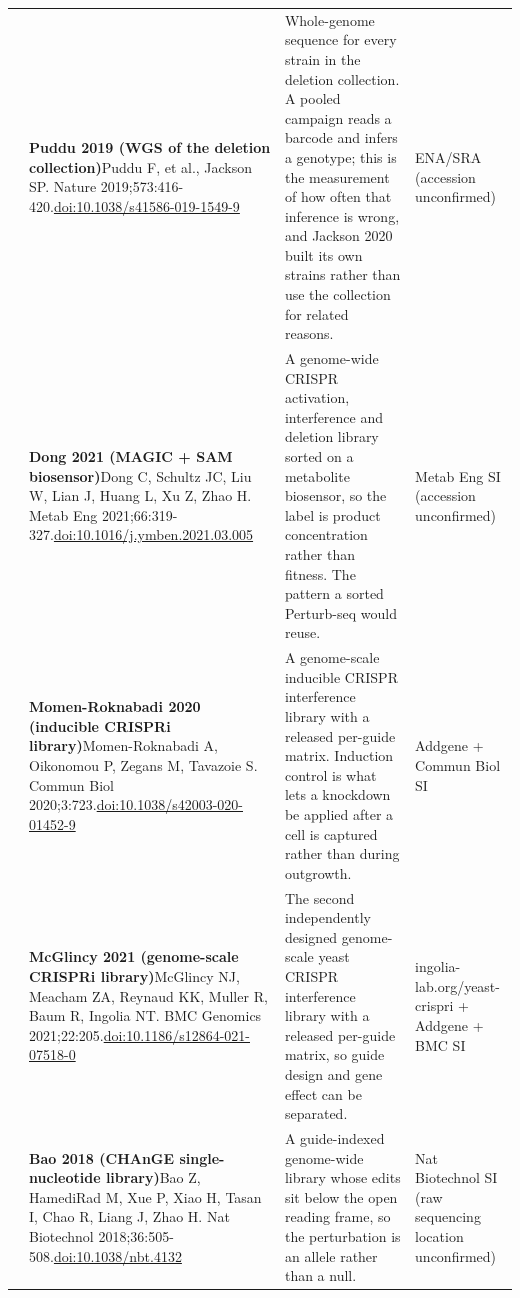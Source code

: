 \begin{landscape}
\begin{longtable}{@{}r@{\hspace{4pt}} L{86mm} L{92mm} L{62mm}@{}}
 & \textbf{Puddu 2019 (WGS of the deletion collection)}\newline Puddu F, et al., Jackson SP. Nature 2019;573:416-420.\newline \href{https://doi.org/10.1038/s41586-019-1549-9}{doi:10.1038/\allowbreak s41586-019-1549-9} & Whole-genome sequence for every strain in the deletion collection. A pooled campaign reads a barcode and infers a genotype; this is the measurement of how often that inference is wrong, and Jackson 2020 built its own strains rather than use the collection for related reasons. & ENA/\allowbreak SRA (accession unconfirmed) \\
 & \textbf{Dong 2021 (MAGIC + SAM biosensor)}\newline Dong C, Schultz JC, Liu W, Lian J, Huang L, Xu Z, Zhao H. Metab Eng 2021;66:319-327.\newline \href{https://doi.org/10.1016/j.ymben.2021.03.005}{doi:10.1016/\allowbreak j.ymben.2021.03.005} & A genome-wide CRISPR activation, interference and deletion library sorted on a metabolite biosensor, so the label is product concentration rather than fitness. The pattern a sorted Perturb-seq would reuse. & Metab Eng SI (accession unconfirmed) \\
 & \textbf{Momen-Roknabadi 2020 (inducible CRISPRi library)}\newline Momen-Roknabadi A, Oikonomou P, Zegans M, Tavazoie S. Commun Biol 2020;3:723.\newline \href{https://doi.org/10.1038/s42003-020-01452-9}{doi:10.1038/\allowbreak s42003-020-01452-9} & A genome-scale inducible CRISPR interference library with a released per-guide matrix. Induction control is what lets a knockdown be applied after a cell is captured rather than during outgrowth. & Addgene + Commun Biol SI \\
 & \textbf{McGlincy 2021 (genome-scale CRISPRi library)}\newline McGlincy NJ, Meacham ZA, Reynaud KK, Muller R, Baum R, Ingolia NT. BMC Genomics 2021;22:205.\newline \href{https://doi.org/10.1186/s12864-021-07518-0}{doi:10.1186/\allowbreak s12864-021-07518-0} & The second independently designed genome-scale yeast CRISPR interference library with a released per-guide matrix, so guide design and gene effect can be separated. & ingolia-lab.org/\allowbreak yeast-crispri + Addgene + BMC SI \\
 & \textbf{Bao 2018 (CHAnGE single-nucleotide library)}\newline Bao Z, HamediRad M, Xue P, Xiao H, Tasan I, Chao R, Liang J, Zhao H. Nat Biotechnol 2018;36:505-508.\newline \href{https://doi.org/10.1038/nbt.4132}{doi:10.1038/\allowbreak nbt.4132} & A guide-indexed genome-wide library whose edits sit below the open reading frame, so the perturbation is an allele rather than a null. & Nat Biotechnol SI (raw sequencing location unconfirmed) \\

\end{longtable}
\end{landscape}

